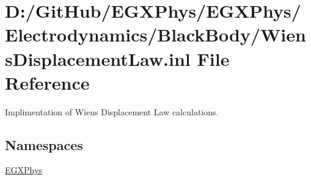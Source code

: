 \hypertarget{_wiens_displacement_law_8inl}{}\section{D\+:/\+Git\+Hub/\+E\+G\+X\+Phys/\+E\+G\+X\+Phys/\+Electrodynamics/\+Black\+Body/\+Wiens\+Displacement\+Law.inl File Reference}
\label{_wiens_displacement_law_8inl}


Implimentation of Wien\textquotesingle{}s Displacement Law calculations.  


\subsection*{Namespaces}
\begin{DoxyCompactItemize}
\item 
 \mbox{\hyperlink{namespace_e_g_x_phys}{E\+G\+X\+Phys}}
\end{DoxyCompactItemize}

